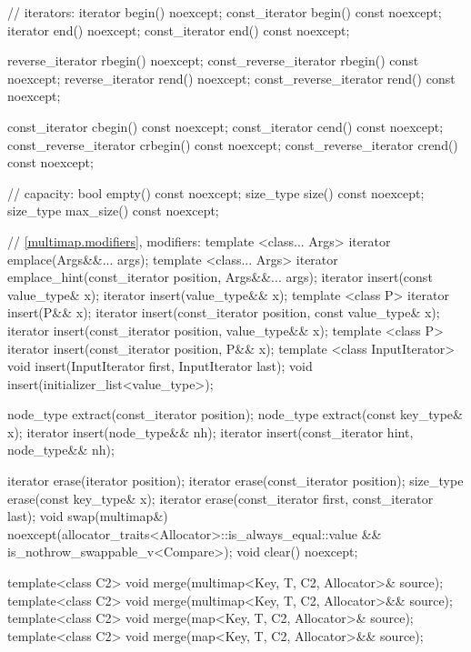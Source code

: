 \begin{codeblock}
{{    // iterators:
    iterator               begin() noexcept;
    const_iterator         begin() const noexcept;
    iterator               end() noexcept;
    const_iterator         end() const noexcept;

    reverse_iterator       rbegin() noexcept;
    const_reverse_iterator rbegin() const noexcept;
    reverse_iterator       rend() noexcept;
    const_reverse_iterator rend() const noexcept;

    const_iterator         cbegin() const noexcept;
    const_iterator         cend() const noexcept;
    const_reverse_iterator crbegin() const noexcept;
    const_reverse_iterator crend() const noexcept;

    // capacity:
    bool      empty() const noexcept;
    size_type size() const noexcept;
    size_type max_size() const noexcept;

    // \ref{multimap.modifiers}, modifiers:
    template <class... Args> iterator emplace(Args&&... args);
    template <class... Args> iterator emplace_hint(const_iterator position, Args&&... args);
    iterator insert(const value_type& x);
    iterator insert(value_type&& x);
    template <class P> iterator insert(P&& x);
    iterator insert(const_iterator position, const value_type& x);
    iterator insert(const_iterator position, value_type&& x);
    template <class P> iterator insert(const_iterator position, P&& x);
    template <class InputIterator>
      void insert(InputIterator first, InputIterator last);
    void insert(initializer_list<value_type>);

    node_type extract(const_iterator position);
    node_type extract(const key_type& x);
    iterator insert(node_type&& nh);
    iterator insert(const_iterator hint, node_type&& nh);

    iterator  erase(iterator position);
    iterator  erase(const_iterator position);
    size_type erase(const key_type& x);
    iterator  erase(const_iterator first, const_iterator last);
    void      swap(multimap&)
      noexcept(allocator_traits<Allocator>::is_always_equal::value &&
               is_nothrow_swappable_v<Compare>);
    void      clear() noexcept;

    template<class C2>
      void merge(multimap<Key, T, C2, Allocator>& source);
    template<class C2>
      void merge(multimap<Key, T, C2, Allocator>&& source);
    template<class C2>
      void merge(map<Key, T, C2, Allocator>& source);
    template<class C2>
      void merge(map<Key, T, C2, Allocator>&& source);

}}
\end{codeblock}
